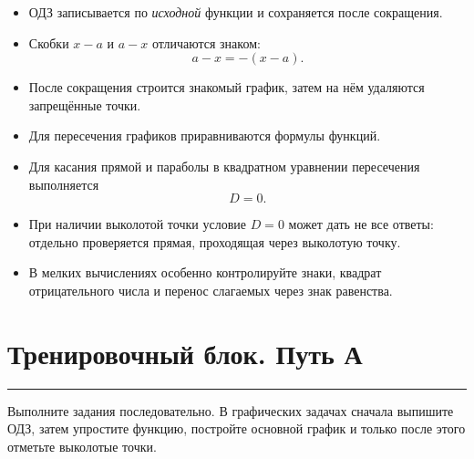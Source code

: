 \documentclass[a4paper,12pt]{article}
\newcommand{\sectionrule}{%
    \par
    \vspace{-0.4em}
    {\color{accent}\rule{\linewidth}{0.5pt}}
    \vspace{0.4em}
}
\begin{document}
\begin{itemize}

\item
ОДЗ записывается по \emph{исходной} функции и сохраняется после сокращения.

\item
Скобки $x-a$ и $a-x$ отличаются знаком:
\[
a-x=-(x-a).
\]

\item
После сокращения строится знакомый график, затем на нём удаляются запрещённые точки.

\item
Для пересечения графиков приравниваются формулы функций.

\item
Для касания прямой и параболы в квадратном уравнении пересечения выполняется
\[
D=0.
\]

\item
При наличии выколотой точки условие $D=0$ может дать не все ответы: отдельно проверяется прямая, проходящая через выколотую точку.

\item
В мелких вычислениях особенно контролируйте знаки, квадрат отрицательного числа и перенос слагаемых через знак равенства.

\end{itemize}


\clearpage

\section*{Тренировочный блок. Путь А}
\sectionrule

Выполните задания последовательно. В графических задачах сначала выпишите ОДЗ, затем упростите функцию, постройте основной график и только после этого отметьте выколотые точки.
\end{document}
